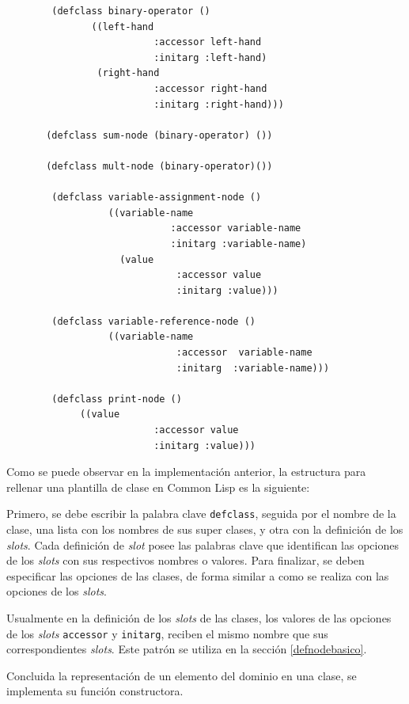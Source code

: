\begin{verbatim}
        (defclass binary-operator ()
               ((left-hand 
                          :accessor left-hand
                          :initarg :left-hand)
                (right-hand 
                          :accessor right-hand 
                          :initarg :right-hand)))
                             
       (defclass sum-node (binary-operator) ())
        
       (defclass mult-node (binary-operator)())    
        
        (defclass variable-assignment-node ()
                  ((variable-name 
                             :accessor variable-name 
                             :initarg :variable-name)
                    (value 
                              :accessor value
                              :initarg :value)))
        
        (defclass variable-reference-node ()
                  ((variable-name 
                              :accessor  variable-name
                              :initarg  :variable-name)))
        
        (defclass print-node ()
             ((value
                          :accessor value
                          :initarg :value)))
\end{verbatim}

Como se puede observar en la implementación anterior, la estructura para rellenar una plantilla de clase en Common Lisp es la siguiente:

Primero, se debe escribir la palabra clave \texttt{defclass}, seguida por el nombre de la clase, una lista con los nombres de sus super clases, y otra con la definición de los \textit{slots}. Cada definición de \textit{slot} posee las palabras clave que identifican las opciones de los \textit{slots} con sus respectivos nombres o valores. Para finalizar, se deben especificar las opciones de las clases, de forma similar a como se realiza con las opciones de los \textit{slots}. 

Usualmente en la definición de los \textit{slots} de las clases, los valores de las opciones de los \textit{slots} \texttt{accessor} y \texttt{initarg}, reciben el mismo nombre que sus correspondientes \textit{slots}. Este patrón se utiliza  en la sección \ref{defnodebasico}. 

Concluida la representación de un elemento del dominio en una clase, se implementa su función constructora. 


